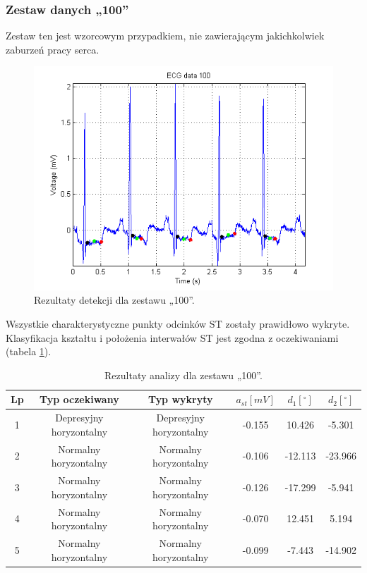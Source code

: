 \subsubsection*{Zestaw danych „100”}
Zestaw ten jest wzorcowym przypadkiem, nie zawierającym jakichkolwiek zaburzeń pracy serca.
\begin{figure}[H]
	\centering
	\includegraphics[width=1\textwidth]{ST_INTERVAL/img/ST_zestaw100.png}
	\caption{Rezultaty detekcji dla zestawu „100”.}
	\label{fig:ST_zestaw100}
\end{figure}
Wszystkie charakterystyczne punkty odcinków ST zostały prawidłowo wykryte. Klasyfikacja kształtu i położenia interwałów ST jest zgodna z oczekiwaniami (tabela \ref{tab:ST_zestaw100}).
\begin{table}[H]
	\centering
	\caption{Rezultaty analizy dla zestawu „100”.}
	\label{tab:ST_zestaw100}
	\begin{tabular}{|c|c|c|c|c|c|}
	\hline
	Lp & Typ oczekiwany & Typ wykryty & $ a_{st} [mV] $ & $ d_1 [^\circ] $ & $ d_2 [^\circ] $ \\ \hline
	1	&	Depresyjny horyzontalny	&	Depresyjny horyzontalny	&	-0.155	&	10.426	&	-5.301	\\ \hline
	2	&	Normalny horyzontalny	&	Normalny horyzontalny	&	-0.106	&	-12.113	&	-23.966	\\ \hline
	3	&	Normalny horyzontalny	&	Normalny horyzontalny	&	-0.126	&	-17.299	&	-5.941	\\ \hline
	4	&	Normalny horyzontalny	&	Normalny horyzontalny	&	-0.070	&	12.451	&	5.194	\\ \hline
	5	&	Normalny horyzontalny	&	Normalny horyzontalny	&	-0.099	&	-7.443	&	-14.902	\\ \hline
	\end{tabular}
\end{table}

